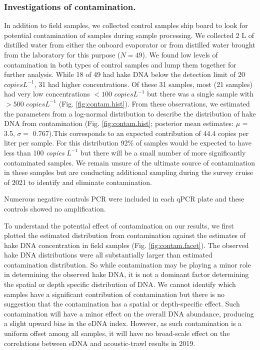 \documentclass[
]{article}
\begin{document}
\hypertarget{investigations-of-contamination.}{%
\subsubsection{Investigations of
contamination.}\label{investigations-of-contamination.}}

In addition to field samples, we collected control samples ship board to
look for potential contamination of samples during sample processing. We
collected 2 L of distilled water from either the onboard evaporator or
from distilled water brought from the laboratory for this purpose
(\(N=49\)). We found low levels of contamination in both types of
control samples and lump them together for further analysis. While 18 of
49 had hake DNA below the detection limit of 20 \(copies L^{-1}\), 31
had higher concentrations. Of these 31 samples, most (21 samples) had
very low concentrations \(<100\) \(copies L^{-1}\) but there was a
single sample with \(>500\) \(copies L^{-1}\) (Fig.
\ref{fig:contam.hist}). From these observations, we estimated the
parameters from a log-normal distribution to describe the distribution
of hake DNA from contamination (Fig. \ref{fig:contam.hist}; posterior
mean estimates: \(\mu\) = 3.5, \(\sigma =\) 0.767).This corresponds to
an expected contribution of 44.4 copies per liter per sample. For this
distribution 92\% of samples would be expected to have less than 100
\emph{copies} \(L^{-1}\) but there will be a small number of more
significantly contaminated samples. We remain unsure of the ultimate
source of contamination in these samples but are conducting additional
sampling during the survey cruise of 2021 to identify and eliminate
contamination.

Numerous negative controls PCR were included in each qPCR plate and
these controls showed no amplification.

To understand the potential effect of contamination on our results, we
first plotted the estimated distribution from contamination against the
estimates of hake DNA concentration in field samples (Fig.
\ref{fig:contam.facet}). The observed hake DNA distributions were all
substantially larger than estimated contamination distribution. So while
contamination may be playing a minor role in determining the observed
hake DNA, it is not a dominant factor determining the spatial or depth
specific distribution of DNA. We cannot identify which samples have a
significant contribution of contamination but there is no suggestion
that the contamination has a spatial or depth-specific effect. Such
contamination will have a minor effect on the overall DNA abundance,
producing a slight upward bias in the eDNA index. However, as such
contamination is a uniform offset among all samples, it will have no
broad-scale effect on the correlations between eDNA and acoustic-trawl
results in 2019.
\end{document}
